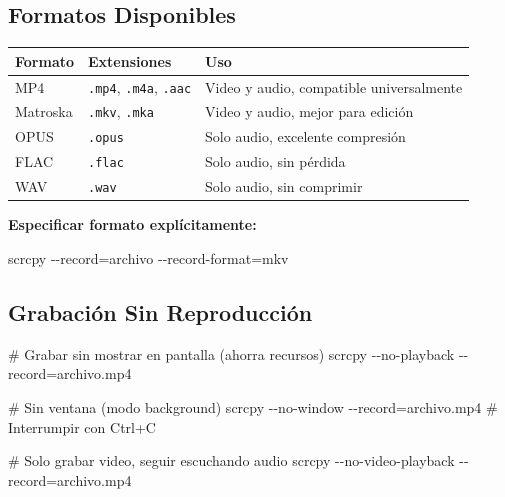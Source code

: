 \documentclass[
  doc,
  floatsintext,
  longtable,
  a4paper,
  nolmodern,
  notxfonts,
  notimes,
  12pt,
  colorlinks=true,linkcolor=blue,citecolor=blue,urlcolor=blue]{apa7}
\newenvironment{Shaded}{\begin{snugshade}}{\end{snugshade}}
\newcommand{\AttributeTok}[1]{\textcolor[rgb]{0.40,0.45,0.13}{#1}}
\newcommand{\CommentTok}[1]{\textcolor[rgb]{0.37,0.37,0.37}{#1}}
\newcommand{\ExtensionTok}[1]{\textcolor[rgb]{0.00,0.23,0.31}{#1}}
\newcommand{\NormalTok}[1]{\textcolor[rgb]{0.00,0.23,0.31}{#1}}
\newcommand{\OperatorTok}[1]{\textcolor[rgb]{0.37,0.37,0.37}{#1}}
\newcounter{none} %
\begin{document}
\subsection{Formatos Disponibles}\label{formatos-disponibles}

{\def\LTcaptype{none} %
\begin{longtable}[]{@{}lll@{}}
\toprule\noalign{}
Formato & Extensiones & Uso \\
\midrule\noalign{}
\endhead
\bottomrule\noalign{}
\endlastfoot
MP4 & \texttt{.mp4}, \texttt{.m4a}, \texttt{.aac} & Video y audio,
compatible universalmente \\
Matroska & \texttt{.mkv}, \texttt{.mka} & Video y audio, mejor para
edición \\
OPUS & \texttt{.opus} & Solo audio, excelente compresión \\
FLAC & \texttt{.flac} & Solo audio, sin pérdida \\
WAV & \texttt{.wav} & Solo audio, sin comprimir \\
\end{longtable}
}

\textbf{Especificar formato explícitamente:}

\begin{Shaded}
\begin{Highlighting}[]
\ExtensionTok{scrcpy} \AttributeTok{{-}{-}record}\OperatorTok{=}\NormalTok{archivo }\AttributeTok{{-}{-}record{-}format}\OperatorTok{=}\NormalTok{mkv}
\end{Highlighting}
\end{Shaded}

\subsection{Grabación Sin
Reproducción}\label{grabaciuxf3n-sin-reproducciuxf3n}

\begin{Shaded}
\begin{Highlighting}[]
\CommentTok{\# Grabar sin mostrar en pantalla (ahorra recursos)}
\ExtensionTok{scrcpy} \AttributeTok{{-}{-}no{-}playback} \AttributeTok{{-}{-}record}\OperatorTok{=}\NormalTok{archivo.mp4}

\CommentTok{\# Sin ventana (modo background)}
\ExtensionTok{scrcpy} \AttributeTok{{-}{-}no{-}window} \AttributeTok{{-}{-}record}\OperatorTok{=}\NormalTok{archivo.mp4}
\CommentTok{\# Interrumpir con Ctrl+C}

\CommentTok{\# Solo grabar video, seguir escuchando audio}
\ExtensionTok{scrcpy} \AttributeTok{{-}{-}no{-}video{-}playback} \AttributeTok{{-}{-}record}\OperatorTok{=}\NormalTok{archivo.mp4}
\end{Highlighting}
\end{Shaded}
\end{document}
